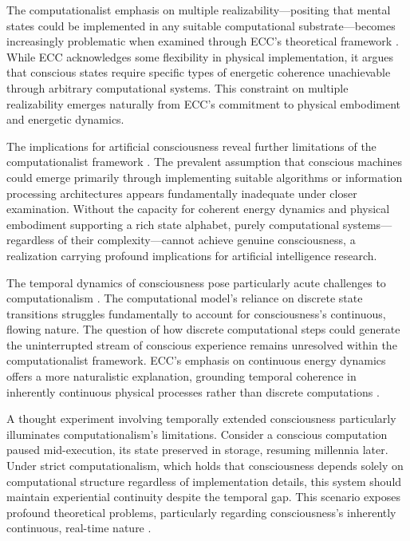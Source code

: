 The computationalist emphasis on multiple realizability—positing that mental states could be implemented in any suitable computational substrate—becomes increasingly problematic when examined through ECC's theoretical framework \cite{maturana1980autopoiesis}. While ECC acknowledges some flexibility in physical implementation, it argues that conscious states require specific types of energetic coherence unachievable through arbitrary computational systems. This constraint on multiple realizability emerges naturally from ECC's commitment to physical embodiment and energetic dynamics.

The implications for artificial consciousness reveal further limitations of the computationalist framework \cite{van1998dynamical}. The prevalent assumption that conscious machines could emerge primarily through implementing suitable algorithms or information processing architectures appears fundamentally inadequate under closer examination. Without the capacity for coherent energy dynamics and physical embodiment supporting a rich state alphabet, purely computational systems—regardless of their complexity—cannot achieve genuine consciousness, a realization carrying profound implications for artificial intelligence research.

The temporal dynamics of consciousness pose particularly acute challenges to computationalism \cite{van1998dynamical}. The computational model's reliance on discrete state transitions struggles fundamentally to account for consciousness's continuous, flowing nature. The question of how discrete computational steps could generate the uninterrupted stream of conscious experience remains unresolved within the computationalist framework. ECC's emphasis on continuous energy dynamics offers a more naturalistic explanation, grounding temporal coherence in inherently continuous physical processes rather than discrete computations \cite{wheeler2005reconstructing}.

A thought experiment involving temporally extended consciousness particularly illuminates computationalism's limitations. Consider a conscious computation paused mid-execution, its state preserved in storage, resuming millennia later. Under strict computationalism, which holds that consciousness depends solely on computational structure regardless of implementation details, this system should maintain experiential continuity despite the temporal gap. This scenario exposes profound theoretical problems, particularly regarding consciousness's inherently continuous, real-time nature \cite{fodor2000mind}.

